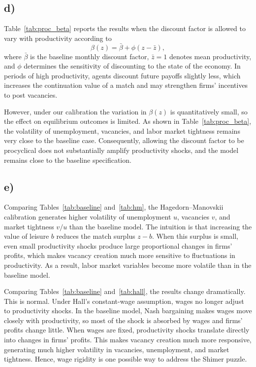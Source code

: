 \documentclass[12pt]{article}
\begin{document}
\subsection*{d)}
Table~\ref{tab:proc_beta} reports the results when the discount factor is allowed to vary with productivity according to
\[
\beta(z) = \bar{\beta} + \phi (z - \bar{z}),
\]
where $\bar{\beta}$ is the baseline monthly discount factor, $\bar{z}=1$ denotes mean productivity, and $\phi$ determines the sensitivity of discounting to the state of the economy. In periods of high productivity, agents discount future payoffs slightly less, which increases the continuation value of a match and may strengthen firms’ incentives to post vacancies.

However, under our calibration the variation in $\beta(z)$ is quantitatively small, so the effect on equilibrium outcomes is limited. As shown in Table~\ref{tab:proc_beta}, the volatility of unemployment, vacancies, and labor market tightness remains very close to the baseline case. Consequently, allowing the discount factor to be procyclical does not substantially amplify productivity shocks, and the model remains close to the baseline specification.

\subsection*{e)}

Comparing Tables~\ref{tab:baseline} and~\ref{tab:hm}, the Hagedorn--Manovskii calibration generates higher volatility of unemployment $u$, vacancies $v$, and market tightness $v/u$ than the baseline model. The intuition is that increasing the value of leisure $b$ reduces the match surplus $z-b$. When this surplus is small, even small productivity shocks produce large proportional changes in firms' profits, which makes vacancy creation much more sensitive to fluctuations in productivity. As a result, labor market variables become more volatile than in the baseline model.

Comparing Tables~\ref{tab:baseline} and~\ref{tab:hall}, the results change dramatically. This is normal. Under Hall's constant-wage assumption, wages no longer adjust to productivity shocks. In the baseline model, Nash bargaining makes wages move closely with productivity, so most of the shock is absorbed by wages and firms' profits change little. When wages are fixed, productivity shocks translate directly into changes in firms' profits. This makes vacancy creation much more responsive, generating much higher volatility in vacancies, unemployment, and market tightness. Hence, wage rigidity is one possible way to address the Shimer puzzle.
\end{document}
